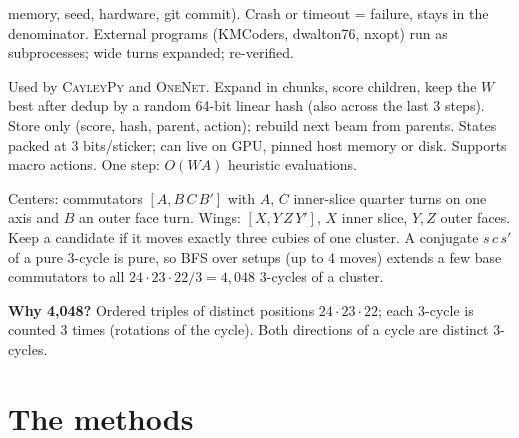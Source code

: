 \documentclass[10.5pt,a4paper]{article}
\newcommand{\M}[1]{\textsc{#1}}
\begin{document}
\begin{description}[style=nextline]
memory, seed, hardware, git commit). Crash or timeout = failure, stays in the denominator. External programs (KMCoders, dwalton76,
nxopt) run as subprocesses; wide turns expanded; re-verified.
\item[Shared beam search (\texttt{search/beam.py})] Used by \M{CayleyPy} and \M{OneNet}. Expand in chunks, score children, keep
the $W$ best after dedup by a random 64-bit linear hash (also across the last 3 steps). Store only (score, hash, parent, action);
rebuild next beam from parents. States packed at 3 bits/sticker; can live on GPU, pinned host memory or disk. Supports macro
actions. One step: $O(WA)$ heuristic evaluations.
\item[Pure 3-cycles for any cluster (\texttt{cluster\_tools.py}, \texttt{search/macros.py})] Centers: commutators $[A, B\,C\,B']$
with $A$, $C$ inner-slice quarter turns on one axis and $B$ an outer face turn. Wings: $[X, Y\,Z\,Y']$, $X$ inner slice, $Y,Z$ outer
faces. Keep a candidate if it moves exactly three cubies of one cluster. A conjugate $s\,c\,s'$ of a pure 3-cycle is pure, so BFS
over setups (up to 4 moves) extends a few base commutators to all $24\cdot23\cdot22/3=4{,}048$ 3-cycles of a cluster.
\end{description}

\textbf{Why 4,048?} Ordered triples of distinct positions $24\cdot23\cdot22$; each 3-cycle is counted 3 times (rotations of the
cycle). Both directions of a cycle are distinct 3-cycles.

\section{The methods}
\end{document}
